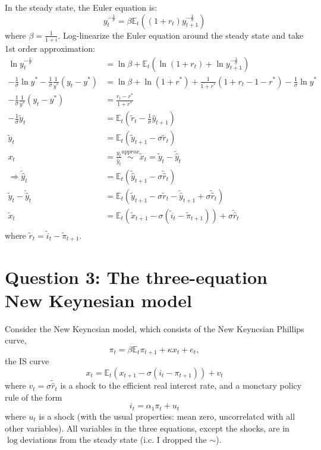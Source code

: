 \begin{solution}
    In the steady state, the Euler equation is:
    \[
    y_t^{-\frac1\sigma}=\beta \mathbb{E}_t\left((1+r_t)y_{t+1}^{-\frac1\sigma}\right)
    \]
    where $\beta = \frac{1}{1+i}.$
    Log-linearize the Euler equation around the steady state and take 1st order approximation:
    \begin{align*}
        \ln y_t^{-\frac1\sigma} &= \ln \beta + \mathbb{E}_t\left(\ln(1+r_t) + \ln y_{t+1}^{-\frac1\sigma}\right) \\
        -\frac1\sigma \ln y^* - \frac{1}{\sigma}\frac{1}{y^*}(y_{t}-y^*) &= \ln \beta + \ln(1+r^*) + \frac{1}{1+r^*}(1+r_t - 1-r^*) - \frac{1}{\sigma}\ln y^* \\
        -\frac{1}{\sigma}\frac{1}{y^*}(y_{t}-y^*) &= \frac{r_t - r^*}{1+r^*}\\
        -\frac{1}{\sigma}\tilde{y}_t &= \mathbb{E}_t\left(\tilde{r}_{t} - \frac{1}{\sigma}\hat{y}_{t+1} \right)\\
        \tilde{y}_t &= \mathbb{E}_t\left(\tilde{y}_{t+1} - \sigma \tilde{r}_t\right)\\
        x_t &= \frac{y_t}{\hat{y}_t} \overset{approx}{\sim} \tilde{x}_t = \tilde{y}_t -\tilde{\hat{y}}_t\\
        \Rightarrow \tilde{\hat{y}}_t &= \mathbb{E}_t\left(\tilde{\hat{y}}_{t+1} - \sigma \tilde{\hat{r}}_t\right)\\
        \tilde{y}_t - \tilde{\hat{y}}_t &= \mathbb{E}_t\left(\tilde{y}_{t+1} - \sigma \tilde{r}_t - \tilde{\hat{y}}_{t+1} + \sigma \tilde{\hat{r}}_t\right)\\
        \tilde{x}_t &= \mathbb{E}_t\left(\tilde{x}_{t+1} - \sigma(\tilde{i}_t - \tilde{\pi}_{t+1})\right) + \sigma \tilde{\hat{r}}_t\\
    \end{align*}
    where $\tilde{r}_t = \tilde{i}_t - \tilde{\pi}_{t+1}.$
\end{solution}

\section*{Question 3: The three-equation New Keynesian model}
Consider the New Keyncsian model, which consists of the New Keyncsian Phillips curve,
$$\pi_t=\beta\mathbb{E}_t\pi_{t+1}+\kappa x_t+e_t,$$
the IS curve
$$x_t=\mathbb{E}_t\left(x_{t+1}-\sigma(i_t-\pi_{t+1})\right)+v_t$$
where $v_t=\sigma\widetilde{\hat{r}}_t$ is a shock to the efficient real intercst rate, and a monctary policy rule of the form
$$i_t=\alpha_1\pi_t+u_t$$
where $u_t$ is a shock (with the usual properties: mean zero, uncorrelatcd with all other variables). 
All variables in the three equations, except the shocks, 
are in $\log$deviations from the stcady state 
(i.c. I dropped the $\sim$).


